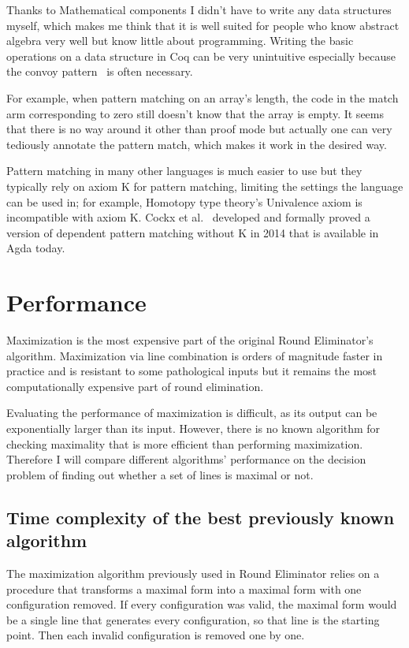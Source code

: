 \documentclass[english, 12pt, a4paper, sci, a-1b, online]{aaltothesis}
\begin{document}
Thanks to Mathematical components I didn't have to write any data structures myself, which makes me think that it is well suited for people who know abstract algebra very well but know little about programming. Writing the basic operations on a data structure in Coq can be very unintuitive especially because the convoy pattern~\cite{CPDT} is often necessary.

For example, when pattern matching on an array's length, the code in the match arm corresponding to zero still doesn't know that the array is empty. It seems that there is no way around it other than proof mode but actually one can very tediously annotate the pattern match, which makes it work in the desired way.

Pattern matching in many other languages is much easier to use but they typically rely on axiom K for pattern matching, limiting the settings the language can be used in; for example, Homotopy type theory's Univalence axiom is incompatible with axiom K. Cockx et al.~\cite{withoutK} developed and formally proved a version of dependent pattern matching without K in 2014 that is available in Agda today.

\section{Performance}

Maximization is the most expensive part of the original Round Eliminator's algorithm. Maximization via line combination is orders of magnitude faster in practice and is resistant to some pathological inputs but it remains the most computationally expensive part of round elimination. %

Evaluating the performance of maximization is difficult, as its output can be exponentially larger than its input. However, there is no known algorithm for checking maximality that is more efficient than performing maximization. Therefore I will compare different algorithms' performance on the decision problem of finding out whether a set of lines is maximal or not.

\subsection{Time complexity of the best previously known algorithm}

The maximization algorithm previously used in Round Eliminator relies on a procedure that transforms a maximal form into a maximal form with one configuration removed. If every configuration was valid, the maximal form would be a single line that generates every configuration, so that line is the starting point. Then each invalid configuration is removed one by one.
\end{document}
